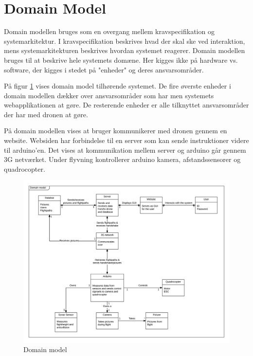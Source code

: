 \section{Domain Model}

Domain modellen bruges som en overgang mellem kravspecifikation og systemarkitektur. I kravspecifikation beskrives hvad der skal ske ved interaktion, mens systemarkitekturen beskrives hvordan systemet reagerer. Domain modellen bruges til at beskrive hele systemets domæne. Her kigges ikke på hardware vs. software, der kigges i stedet på "enheder" og deres ansvarsområder.

På figur \ref{fig:domain_model} vises domain model tilhørende systemet. De fire øverste enheder i domain modellen dækker over ansvarsområder som har men systemets webapplikationen at gøre. De resterende enheder er alle tilknyttet ansvarsområder der har med dronen at gøre.

På domain modellen vises at bruger kommunikerer med dronen gennem en website. Websiden har forbindelse til en server som kan sende instruktioner videre til arduino'en. Det vises at kommunikation mellem server og arduino går gennem 3G netværket. Under flyvning kontrollerer arduino kamera, afstandssensorer og quadrocopter. 

\vspace{-5pt}
\begin{figure}[H]
	\centering
	\includegraphics[width=1.\textwidth]{Billeder/domain_model.png}
	\vspace{-5pt}
	\caption{Domain model}
	\label{fig:domain_model}
\end{figure}